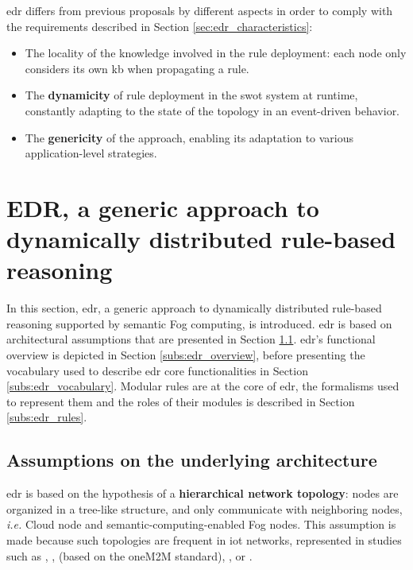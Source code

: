 \documentclass{iosart2c}
\begin{document}
\gls{edr} differs from previous proposals by different aspects in order to comply with the requirements described in Section \textsection \ref{sec:edr_characteristics}:
\begin{itemize}
	\item The locality of the knowledge involved in the rule deployment: each node only considers its own \gls{kb} when propagating a rule.
	\item The \textbf{dynamicity} of rule deployment in the \gls{swot} system at runtime, constantly adapting to the state of the topology in an event-driven behavior.
	\item The \textbf{genericity} of the approach, enabling its adaptation to various application-level strategies.
\end{itemize} 

\section[Distributing reasoning with EDR]{EDR, a generic approach to dynamically distributed rule-based reasoning}
\label{sec:edr}

In this section, \gls{edr}, a generic approach to dynamically distributed rule-based reasoning supported by semantic Fog computing, is introduced. 
\gls{edr} is based on architectural assumptions that are presented in Section \textsection \ref{subs:edr_asumptions}.
\gls{edr}'s functional overview is depicted in Section \textsection \ref{subs:edr_overview}, before presenting the vocabulary used to describe \gls{edr} core functionalities in Section \textsection \ref{subs:edr_vocabulary}.
Modular rules are at the core of \gls{edr}, the formalisms used to represent them and the roles of their modules is described in Section \textsection \ref{subs:edr_rules}.

\subsection{Assumptions on the underlying architecture}
\label{subs:edr_asumptions}

\gls{edr} is based on the hypothesis of a \textbf{hierarchical network topology}: nodes are organized in a tree-like structure, and only communicate with neighboring nodes, \textit{i.e.} Cloud node and semantic-computing-enabled Fog nodes. 
This assumption is made because such topologies are frequent in \gls{iot} networks, represented in studies such as \cite{Rodriguez2010}, \cite{Zanella2014}, \cite{Alaya2015} (based on the oneM2M standard), \cite{Szilagyi2016}, or \cite{Su2018}. 
\end{document}
